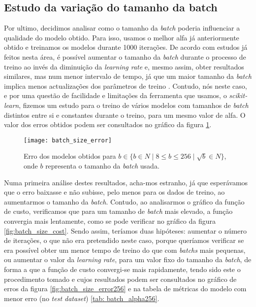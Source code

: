 \subsection{Estudo da variação do tamanho da batch}
Por ultimo, decidimos analisar como o tamanho da \textit{batch} poderia influenciar a qualidade do modelo obtido. Para isso, usamos o melhor alfa já anteriormente obtido e treinamos os modelos durante 1000 iterações. De acordo com estudos já feitos nesta área, é possível aumentar o tamanho da \textit{batch} durante o processo de treino ao invés da diminuição da \textit{learning rate} e, mesmo assim, obter resultados similares, mas num menor intervalo de tempo, já que um maior tamanho da \textit{batch} implica menos actualizações dos parâmetros de treino \cite{batch_size_increase}. Contudo, nós neste caso, e por uma questão de facilidade e limitações da ferramenta que usamos, o \textit{scikit-learn}, fizemos um estudo para o treino de vários modelos com tamanhos de \textit{batch} distintos entre si e constantes durante o treino, para um mesmo valor de alfa. O valor dos erros obtidos podem ser consultados no gráfico da figura \ref{fig:batch_size_error}.
\begin{figure}[!t]
\centering
\texttt{[image: batch\_size\_error]}
\caption{Erro dos modelos obtidos para $b \in \{ b \in \!N \mid 8 \leq b \leq 256 \mid \sqrt{b} \in \!N \}$, onde $b$ representa o tamanho da \textit{batch} usada.}
\label{fig:batch_size_error}
\end{figure}
Numa primeira análise destes resultados, acha-mos estranho, já que esperávamos que o erro baixasse e não subisse, pelo menos para os dados de treino, ao aumentarmos o tamanho da \textit{batch}. Contudo, ao analisarmos o gráfico da função de custo, verificamos que para um tamanho de \textit{batch} mais elevado, a função convergia mais lentamente, como se pode verificar no gráfico da figura \ref{fig:batch_size_cost}. Sendo assim, teríamos duas hipóteses: aumentar o número de iterações, o que não era pretendido neste caso, porque queríamos verificar se era possível obter um menor tempo de treino do que com \textit{batchs} mais pequenas, ou aumentar o valor da \textit{learning rate}, para um valor fixo do tamanho da \textit{batch}, de forma a que a função de custo convergi-se mais rapidamente, tendo sido este o procedimento tomado e cujos resultados podem ser consultados no gráfico de erros da figura \ref{fig:batch_size_error256} e na tabela de métricas do modelo com menor erro (no \textit{test dataset}) \ref{tab: batch_alpha256}. 

